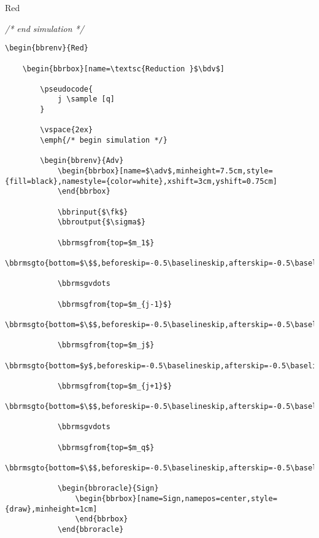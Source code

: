 \documentclass[a4paper]{report}
\begin{document}
\begin{bbrenv}{Red}
\begin{bbrbox}[name=\textsc{Reduction }$\bdv$]
		\vspace{-3ex}
		\emph{/* end simulation */}


	\end{bbrbox}
\end{bbrenv}

\begin{lstlisting}
\begin{bbrenv}{Red}

	\begin{bbrbox}[name=\textsc{Reduction }$\bdv$]

		\pseudocode{
			j \sample [q]
		}

		\vspace{2ex}
		\emph{/* begin simulation */}

		\begin{bbrenv}{Adv}
			\begin{bbrbox}[name=$\adv$,minheight=7.5cm,style={fill=black},namestyle={color=white},xshift=3cm,yshift=0.75cm]
			\end{bbrbox}

			\bbrinput{$\fk$}
			\bbroutput{$\sigma$}

			\bbrmsgfrom{top=$m_1$}
			\bbrmsgto{bottom=$\$$,beforeskip=-0.5\baselineskip,afterskip=-0.5\baselineskip}

			\bbrmsgvdots

			\bbrmsgfrom{top=$m_{j-1}$}
			\bbrmsgto{bottom=$\$$,beforeskip=-0.5\baselineskip,afterskip=-0.5\baselineskip}

			\bbrmsgfrom{top=$m_j$}
			\bbrmsgto{bottom=$y$,beforeskip=-0.5\baselineskip,afterskip=-0.5\baselineskip}

			\bbrmsgfrom{top=$m_{j+1}$}
			\bbrmsgto{bottom=$\$$,beforeskip=-0.5\baselineskip,afterskip=-0.5\baselineskip}

			\bbrmsgvdots

			\bbrmsgfrom{top=$m_q$}
			\bbrmsgto{bottom=$\$$,beforeskip=-0.5\baselineskip,afterskip=-0.5\baselineskip}

			\begin{bbroracle}{Sign}
				\begin{bbrbox}[name=Sign,namepos=center,style={draw},minheight=1cm]
				\end{bbrbox}
			\end{bbroracle}


\end{lstlisting}
\end{document}

